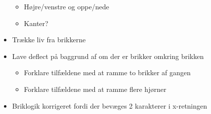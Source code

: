 \begin{itemize}

\begin{itemize}
\item Højre/venstre og oppe/nede
\item Kanter?
\end{itemize}
\item Trække liv fra brikkerne
\item Lave deflect på baggrund af om der er brikker omkring brikken
\begin{itemize}
\item Forklare tilfældene med at ramme to brikker af gangen
\item Forklare tilfældene med at ramme flere hjørner
\end{itemize}
\item Briklogik korrigeret fordi der bevæges 2 karakterer i x-retningen
\end{itemize}

\newpage

